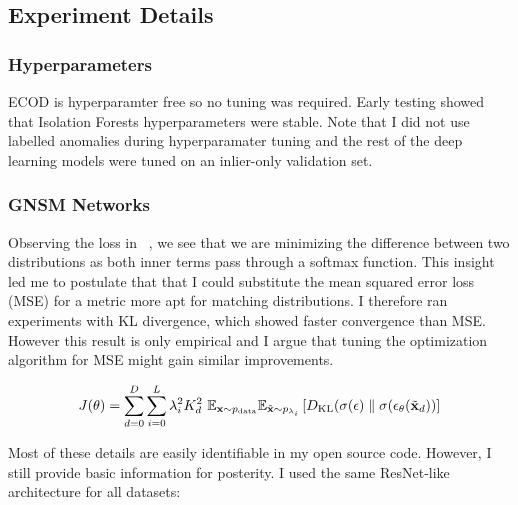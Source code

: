 \subsection*{Experiment Details}

\subsubsection*{Hyperparameters}
ECOD is hyperparamter free so no tuning was required. Early testing showed that Isolation Forests hyperparameters were stable. Note that I did not use labelled anomalies during hyperparamater tuning and the rest of the deep learning models were tuned on an inlier-only validation set.

\subsubsection*{GNSM Networks}


Observing the loss in ~, we see that we are minimizing the difference between two distributions as both inner terms pass through a softmax function. This insight led me to postulate that that I could substitute the mean squared error loss (MSE) for a metric more apt for matching distributions. I therefore ran experiments with KL divergence, which showed faster convergence than MSE. However this result is only empirical and I argue that tuning the optimization algorithm for MSE might gain similar improvements.

\begin{equation}
\label{kl_obj}
    J(\theta)  =  \sum_{d=0}^{D} \sum_{i=0}^{L} \lambda_i^2 K_d^2 ~\mathbb{E}_{\mathbf{x} \sim p_{\text{data}}} \mathbb{E}_{\Tilde{\mathbf{x}} \sim p_{\lambda_i}} \left[ { D_{\text{KL}} (\sigma(\epsilon) \parallel  \sigma( \epsilon_\theta(\tilde{\mathbf{x}}_d) ) } \right]
\end{equation}


Most of these details are easily identifiable in my open source code. However, I still provide basic information for posterity. I used the same ResNet-like architecture for all datasets:

